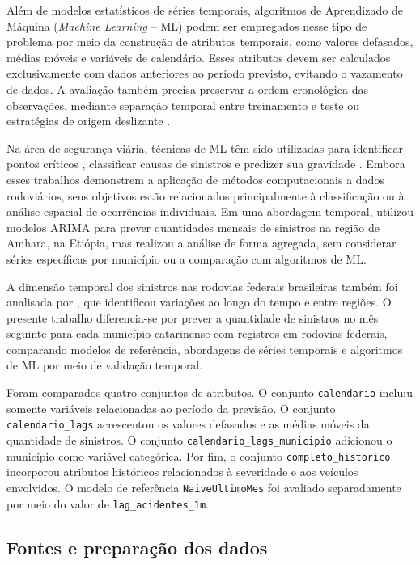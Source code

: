 \documentclass[12pt]{article}
\begin{document}
Além de modelos estatísticos de séries temporais, algoritmos de Aprendizado de Máquina (\textit{Machine Learning} -- ML) podem ser empregados nesse tipo de problema por meio da construção de atributos temporais, como valores defasados, médias móveis e variáveis de calendário. Esses atributos devem ser calculados exclusivamente com dados anteriores ao período previsto, evitando o vazamento de dados. A avaliação também precisa preservar a ordem cronológica das observações, mediante separação temporal entre treinamento e teste ou estratégias de origem deslizante \cite{bergmeir2018crossvalidation,hyndman2021forecasting}.

Na área de segurança viária, técnicas de ML têm sido utilizadas para identificar pontos críticos \cite{santos2021machine}, classificar causas de sinistros \cite{silva2024classificacao} e predizer sua gravidade \cite{mafort2025tecnicas}. Embora esses trabalhos demonstrem a aplicação de métodos computacionais a dados rodoviários, seus objetivos estão relacionados principalmente à classificação ou à análise espacial de ocorrências individuais. Em uma abordagem temporal, \cite{getahun2021timeseries} utilizou modelos ARIMA para prever quantidades mensais de sinistros na região de Amhara, na Etiópia, mas realizou a análise de forma agregada, sem considerar séries específicas por município ou a comparação com algoritmos de ML.

A dimensão temporal dos sinistros nas rodovias federais brasileiras também foi analisada por \cite{moraisneto2021tendencia}, que identificou variações ao longo do tempo e entre regiões. O presente trabalho diferencia-se por prever a quantidade de sinistros no mês seguinte para cada município catarinense com registros em rodovias federais, comparando modelos de referência, abordagens de séries temporais e algoritmos de ML por meio de validação temporal.

Foram comparados quatro conjuntos de atributos. O conjunto \texttt{calendario} incluiu somente variáveis relacionadas ao período da previsão. O conjunto \texttt{calendario\_lags} acrescentou os valores defasados e as médias móveis da quantidade de sinistros. O conjunto \texttt{calendario\_lags\_municipio} adicionou o município como variável categórica. Por fim, o conjunto \texttt{completo\_historico} incorporou atributos históricos relacionados à severidade e aos veículos envolvidos. O modelo de referência \texttt{NaiveUltimoMes} foi avaliado separadamente por meio do valor de \texttt{lag\_acidentes\_1m}.

\subsection{Fontes e preparação dos dados}
\end{document}
